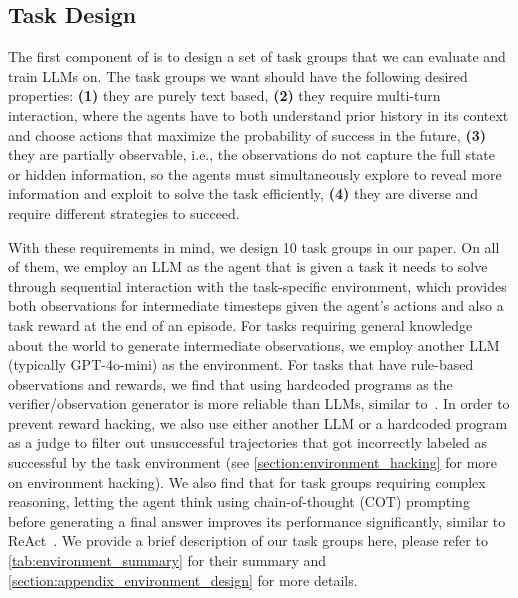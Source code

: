 \subsection{Task Design}


The first component of \ours{} is to design a set of task groups that we can evaluate and train LLMs on. The task groups we want should have the following desired properties: \textbf{(1)} they are purely text based, \textbf{(2)} they require multi-turn interaction, where the agents have to both understand prior history in its context and choose actions that maximize the probability of success in the future, \textbf{(3)} they are partially observable, i.e., the observations do not capture the full state or hidden information, so the agents must simultaneously explore to reveal more information and exploit to solve the task efficiently, \textbf{(4)} they are diverse and require different strategies to succeed. 


With these requirements in mind, we design 10 task groups in our paper. On all of them, we employ an LLM as the agent that is given a task it needs to solve through sequential interaction with the task-specific environment, which provides both observations for intermediate timesteps given the agent's actions and also a task reward at the end of an episode. 
For tasks requiring general knowledge about the world to generate intermediate observations, we employ another LLM (typically GPT-4o-mini) as the environment. For tasks that have rule-based observations and rewards, we find that using hardcoded programs as the verifier/observation generator is more reliable than LLMs, similar to~\citet{deepseekai2025deepseekr1incentivizingreasoningcapability}. In order to prevent reward hacking, we also use either another LLM or a hardcoded program as a judge to filter out unsuccessful trajectories that got incorrectly labeled as successful by the task environment (see \cref{section:environment_hacking} for more on environment hacking). We also find that for task groups requiring complex reasoning, letting the agent think using chain-of-thought (COT) prompting~\citep{wei2022chain, kojima2022large} before generating a final answer improves its performance significantly, similar to ReAct~\citep{yao2023reactsynergizingreasoningacting}. We provide a brief description of our task groups here, please refer to \cref{tab:environment_summary} for their summary and \cref{section:appendix_environment_design} for more details.

